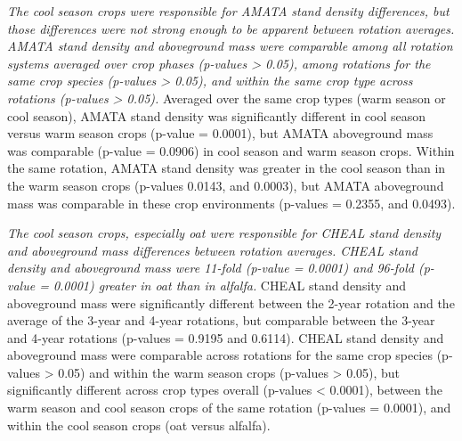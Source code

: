 \documentclass[
]{article}
\begin{document}
\emph{The cool season crops were responsible for AMATA stand density differences, but those differences were not strong enough to be apparent between rotation averages.} \emph{AMATA stand density and aboveground mass were comparable among all rotation systems averaged over crop phases (p-values \textgreater{} 0.05), among rotations for the same crop species (p-values \textgreater{} 0.05), and within the same crop type across rotations (p-values \textgreater{} 0.05).} Averaged over the same crop types (warm season or cool season), AMATA stand density was significantly different in cool season versus warm season crops (p-value = 0.0001), but AMATA aboveground mass was comparable (p-value = 0.0906) in cool season and warm season crops. Within the same rotation, AMATA stand density was greater in the cool season than in the warm season crops (p-values 0.0143, and 0.0003), but AMATA aboveground mass was comparable in these crop environments (p-values = 0.2355, and 0.0493).

\emph{The cool season crops, especially oat were responsible for CHEAL stand density and aboveground mass differences between rotation averages. CHEAL stand density and aboveground mass were 11-fold (p-value = 0.0001) and 96-fold (p-value = 0.0001) greater in oat than in alfalfa.} CHEAL stand density and aboveground mass were significantly different between the 2-year rotation and the average of the 3-year and 4-year rotations, but comparable between the 3-year and 4-year rotations (p-values = 0.9195 and 0.6114). CHEAL stand density and aboveground mass were comparable across rotations for the same crop species (p-values \textgreater{} 0.05) and within the warm season crops (p-values \textgreater{} 0.05), but significantly different across crop types overall (p-values \textless{} 0.0001), between the warm season and cool season crops of the same rotation (p-values = 0.0001), and within the cool season crops (oat versus alfalfa).
\end{document}
